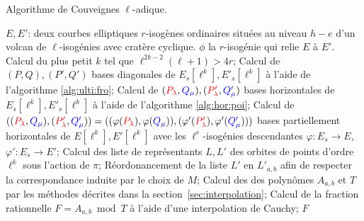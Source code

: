 \documentclass[10pt,a4paper]{book}
\theoremstyle{plain}
\theoremstyle{definition}
\theoremstyle{definition}
\theoremstyle{definition}
\theoremstyle{definition}
\theoremstyle{remark}
\theoremstyle{remark}
\theoremstyle{definition}
\begin{document}
\begin{algorithm}
\caption{\label{alg:cou:ell-adique} Algorithme de Couveignes $\ell$-adique.}
\begin{algorithmic}[1]
\REQUIRE $E,E'$: deux courbes elliptiques $r$-isogènes ordinaires situées au niveau $h-e$ d'un volcan de $\ell$-isogénies avec cratère cyclique.
\ENSURE $\phi$ la $r$-isogénie qui relie $E$ à $E'$.
\STATE Calcul du plus petit $k$ tel que $\ell^{2k-2}(\ell+1)>4r$;
\STATE  \label{alg:cou-ell:bdiag}
Calcul de $(P,Q),(P',Q')$ bases diagonales de $E_s[\ell^k],E'_s[\ell^k]$ à l'aide de l'algorithme \ref{alg:ulti:fro};
\STATE \label{alg:cou-ell:bhor}
Calcul de $(\color{red}P_{\lambda}\color{black},\color{blue}Q_{\mu}\color{black}),(\color{red}P'_{\lambda}\color{black},\color{blue}Q_{\mu}'\color{black})$ bases horizontales de $E_s[\ell^k],E'_s[\ell^k]$ à l'aide de l'algorithme \ref{alg:hor:poi};
\STATE Calcul de $((\color{red}P_{\lambda}\color{black},\color{blue}Q_{\mu}\color{black}),(\color{red}P'_{\lambda}\color{black},\color{blue}Q_{\mu}'\color{black}))=((\varphi(\color{red}P_{\lambda}\color{black}),\varphi(\color{blue}Q_{\mu}\color{black})),(\varphi'(\color{red}P'_{\lambda}\color{black}),\varphi'(\color{blue}Q_{\mu}'\color{black})))$ bases partiellement horizontales de $E[\ell^k],E'[\ell^k]$ avec les $\ell^e$-isogénies descendantes $\varphi: E_s \rightarrow E$, $\varphi': E_s \rightarrow E'$;
\ENDIF
\STATE \label{alg:cou-ell:rep} Calcul des liste de représentants $L,L'$ des orbites de points d'ordre $\ell^k$ sous l'action de $\pi$;
\STATE \label{alg:cou-ell:ord} Réordonancement de la liste $L'$ en $L'_{a,b}$ afin de respecter la correspondance induite par le choix de $M$;
\STATE \label{alg:cou-ell:int} Calcul des des polynômes $A_{a,b}$ et $T$ par les méthodes décrites dans la section~\ref{sec:interpolation};
\STATE \label{alg:cou-ell:Cauchy} Calcul de la fraction rationnelle $F=A_{a,b} \bmod T$ à l'aide d'une interpolation de Cauchy;
\RETURN $F$
\ENDIF
\ENDFOR 
\end{algorithmic}
\end{algorithm}
\end{document}
